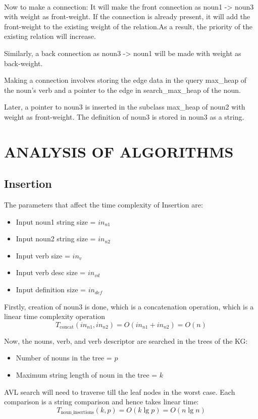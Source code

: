 \documentclass[conference]{IEEEtran}
\begin{document}
\\
Now to make a connection:
It will make the front connection as noun1 -> noun3 with weight as front-weight. If the connection is already present, it will add the front-weight to the existing weight of the relation.As a result, the priority of the existing relation will increase.

Similarly, a back connection as noun3 -> noun1 will be made with weight as back-weight.

Making a connection involves storing the edge data in the query max\_heap of the noun's verb and a pointer to the edge in search\_max\_heap of the noun.

Later, a pointer to noun3 is inserted in the subclass max\_heap of noun2 with weight as front-weight.
The definition of noun3 is stored in noun3 as a string.

\section{ANALYSIS OF ALGORITHMS}
\subsection{Insertion}
The parameters that affect the time complexity of Insertion are:
\begin{itemize}
    \item Input noun1 string size = $in_{n1}$
    \item Input noun2 string size = $in_{n2}$
    \item Input verb size = $in_{v}$
    \item Input verb desc size = $in_{vd}$
    \item Input definition size = $in_{def}$
\end{itemize}

Firstly, creation of noun3 is done, which is a concatenation operation, which is a linear time complexity operation
\\
\begin{equation}
	T_{\text{concat}}(in_{n1}, in_{n2}) = O(in_{n1} + in_{n2}) = O(n)
\end{equation}

Now, the nouns, verb, and verb descriptor are searched in the trees of the KG:
\begin{itemize}
    \item Number of nouns in the tree = $p$
    \item Maximum string length of noun in the tree = $k$
\end{itemize}
AVL search will need to traverse till the leaf nodes in the worst case. Each comparison is a string comparison and hence takes linear time:
\begin{equation}
	T_{\text{noun\_insertions}}(k, p) = O(k \lg p) = O(n \lg n)
\end{equation}
\end{document}
